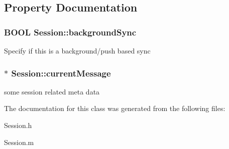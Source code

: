 \subsection{\-Property \-Documentation}
\hypertarget{interface_session_a84f69a053d96ee772bc190bc5772ddc7}{
\subsubsection[{background\-Sync}]{\setlength{\rightskip}{0pt plus 5cm}\-B\-O\-O\-L \-Session\-::background\-Sync}}
\label{interface_session_a84f69a053d96ee772bc190bc5772ddc7}
\-Specify if this is a background/push based sync \hypertarget{interface_session_ae5be82b6c94b660f60d51b63a6f8354c}{
\subsubsection[{current\-Message}]{ $\ast$ \-Session\-::current\-Message}}
\label{interface_session_ae5be82b6c94b660f60d51b63a6f8354c}
some session related meta data 

\-The documentation for this class was generated from the following files\-:\begin{DoxyCompactItemize}
\item 
\-Session.\-h\item 
\-Session.\-m\end{DoxyCompactItemize}

